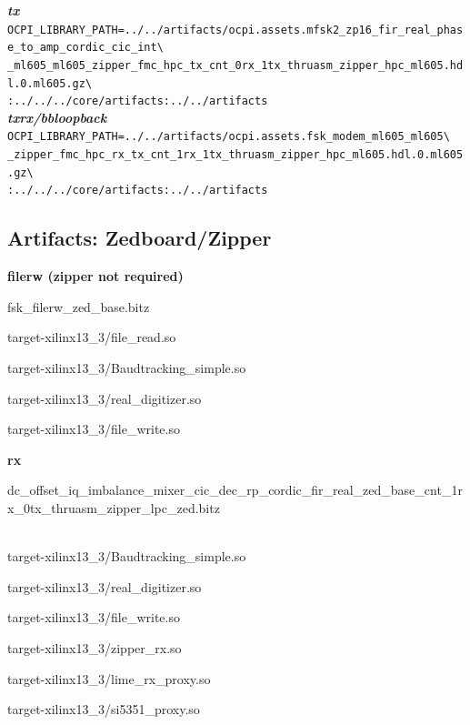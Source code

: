 \begin{appendices}
\noindent\textbf{\textit{tx}}\\
\verb|OCPI_LIBRARY_PATH=../../artifacts/ocpi.assets.mfsk2_zp16_fir_real_phase_to_amp_cordic_cic_int\| \\
\verb|_ml605_ml605_zipper_fmc_hpc_tx_cnt_0rx_1tx_thruasm_zipper_hpc_ml605.hdl.0.ml605.gz\| \\
\verb|:../../../core/artifacts:../../artifacts| \\

\noindent\textbf{\textit{txrx/bbloopback}}\\
\verb|OCPI_LIBRARY_PATH=../../artifacts/ocpi.assets.fsk_modem_ml605_ml605\| \\
\verb|_zipper_fmc_hpc_rx_tx_cnt_1rx_1tx_thruasm_zipper_hpc_ml605.hdl.0.ml605.gz\| \\
\verb|:../../../core/artifacts:../../artifacts| \\


\pagebreak

\subsection{Artifacts: Zedboard/Zipper}
	\noindent\textbf{filerw (zipper not required)}
	\begin{itemize}
	\begin{minipage}[t]{.5\textwidth}
	\item fsk\_filerw\_zed\_base.bitz
	\item target-xilinx13\_3/file\_read.so
	\item target-xilinx13\_3/Baudtracking\_simple.so
	\end{minipage}
	\begin{minipage}[t]{.5\textwidth}
	\item target-xilinx13\_3/real\_digitizer.so
	\item target-xilinx13\_3/file\_write.so
	\end{minipage}
	\end{itemize}

	\noindent\textbf{rx}
	\begin{itemize}
	\item dc\_offset\_iq\_imbalance\_mixer\_cic\_dec\_rp\_cordic\_fir\_real\_zed\_base\_cnt\_1rx\_0tx\_thruasm\_zipper\_lpc\_zed.bitz \\ \\
	\begin{minipage}[t]{.5\textwidth}
	\item target-xilinx13\_3/Baudtracking\_simple.so
	\item target-xilinx13\_3/real\_digitizer.so
	\item target-xilinx13\_3/file\_write.so
	\end{minipage}
	\begin{minipage}[t]{.5\textwidth}
	\item target-xilinx13\_3/zipper\_rx.so
	\item target-xilinx13\_3/lime\_rx\_proxy.so
	\item target-xilinx13\_3/si5351\_proxy.so
	\end{minipage}
	\end{itemize}


\end{appendices}
